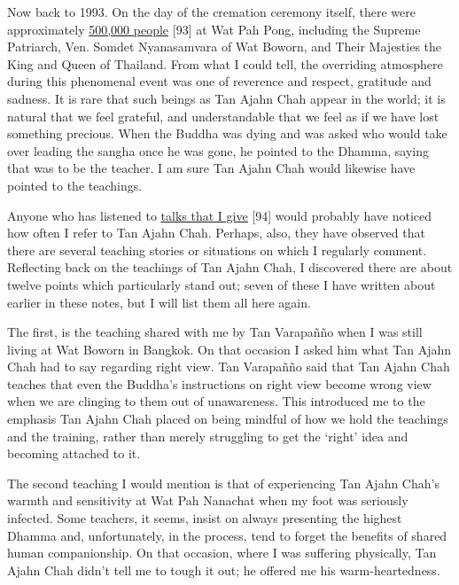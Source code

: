 Now back to 1993. On the day of the cremation ceremony itself, there
were approximately
\href{https://ajahnsucitto.org/travels/the-state-funeral-of-luang-por-chah/}{500,000
people} {[}93{]} at Wat Pah Pong, including the Supreme Patriarch, Ven.
Somdet Nyanasamvara of Wat Boworn, and Their Majesties the King and
Queen of Thailand. From what I could tell, the overriding atmosphere
during this phenomenal event was one of reverence and respect, gratitude
and sadness. It is rare that such beings as Tan Ajahn Chah appear in the
world; it is natural that we feel grateful, and understandable that we
feel as if we have lost something precious. When the Buddha was dying
and was asked who would take over leading the sangha once he was gone,
he pointed to the Dhamma, saying that was to be the teacher. I am sure
Tan Ajahn Chah would likewise have pointed to the teachings.

Anyone who has listened to
\href{https://ratanagiri.org.uk/teachings/talks/teachers/ajahn-munindo}{\underline{talks
that I give}} {[}94{]} would probably have noticed how often I refer to
Tan Ajahn Chah. Perhaps, also, they have observed that there are several
teaching stories or situations on which I regularly comment. Reflecting
back on the teachings of Tan Ajahn Chah, I discovered there are about
twelve points which particularly stand out; seven of these I have
written about earlier in these notes, but I will list them all here
again.

The first, is the teaching shared with me by Tan Varapañño when I was
still living at Wat Boworn in Bangkok. On that occasion I asked him what
Tan Ajahn Chah had to say regarding right view. Tan Varapañño said that
Tan Ajahn Chah teaches that even the Buddha's instructions on right view
become wrong view when we are clinging to them out of unawareness. This
introduced me to the emphasis Tan Ajahn Chah placed on being mindful of
how we hold the teachings and the training, rather than merely
struggling to get the `right' idea and becoming attached to it.

The second teaching I would mention is that of experiencing Tan Ajahn
Chah's warmth and sensitivity at Wat Pah Nanachat when my foot was
seriously infected. Some teachers, it seems, insist on always presenting
the highest Dhamma and, unfortunately, in the process, tend to forget
the benefits of shared human companionship. On that occasion, where I
was suffering physically, Tan Ajahn Chah didn't tell me to tough it out;
he offered me his warm-heartedness.

